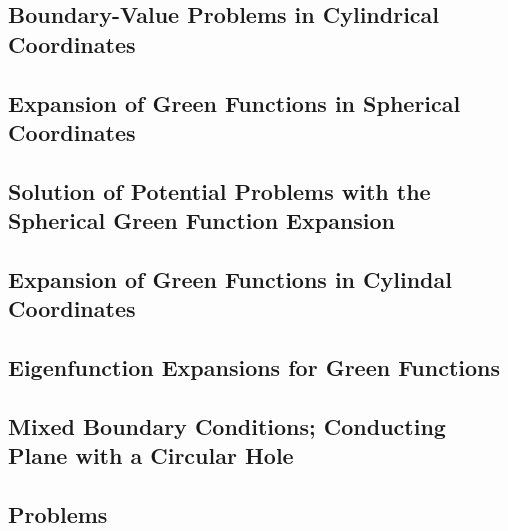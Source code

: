 \subsection{Boundary-Value Problems in Cylindrical Coordinates}

\subsection{Expansion of Green Functions in Spherical Coordinates}

\subsection{Solution of Potential Problems with the Spherical Green Function Expansion}

\subsection{Expansion of Green Functions in Cylindal Coordinates}


\subsection{Eigenfunction Expansions for Green Functions}

\subsection{Mixed Boundary Conditions; Conducting Plane with a Circular Hole}

\subsection*{Problems}





